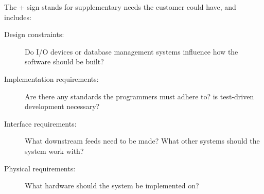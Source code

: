 The + sign stands for supplementary needs the customer could have, and includes:

\begin{description}
    \item [Design constraints:] Do I/O devices or database management systems
    influence how the software should be built?

    \item [Implementation requirements:] Are there any standards the programmers
    must adhere to? is test-driven development necessary?

    \item [Interface requirements:] What downstream feeds need to be made? What
    other systems should the system work with?

    \item [Physical requirements:] What hardware should the system be
    implemented on?
\end{description}
